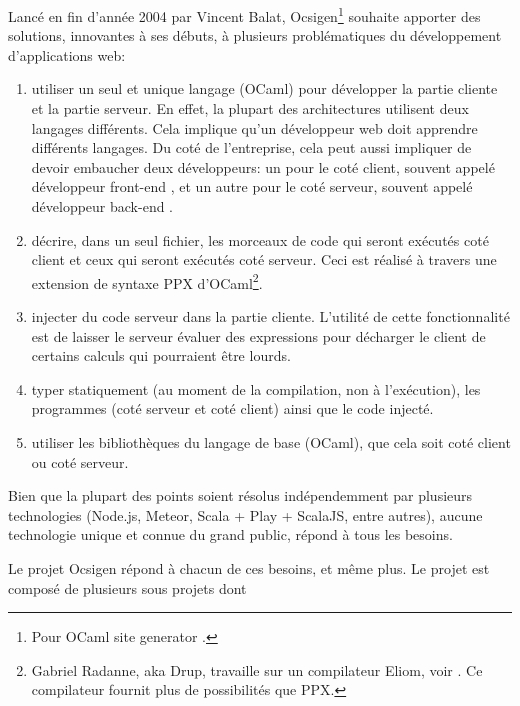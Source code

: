 Lancé en fin d'année 2004 par Vincent Balat, Ocsigen\footnote{Pour \og OCaml site
  generator \fg.} souhaite apporter des solutions, innovantes à ses débuts, à
plusieurs problématiques du développement d'applications web:

\begin{enumerate}
  \item utiliser un seul et unique langage (OCaml) pour développer la partie cliente et
    la partie serveur. En effet, la plupart des architectures utilisent deux
    langages différents. Cela implique qu'un développeur web doit apprendre différents
    langages. Du coté de l'entreprise, cela peut aussi impliquer de devoir
    embaucher deux développeurs: un pour le coté client, souvent appelé
    \og développeur front-end \fg, et un autre pour le coté serveur, souvent appelé
    \og développeur back-end \fg.
  \item décrire, dans un seul fichier, les morceaux de code qui seront
exécutés coté client et ceux qui seront exécutés coté serveur. Ceci est réalisé
à travers une extension de syntaxe PPX d'OCaml\footnote{Gabriel Radanne, aka
  Drup, travaille sur un compilateur Eliom, voir
  \cite{ocsigen-eliomlang-github}. Ce compilateur fournit plus de possibilités
  que PPX.}.
  \item injecter du code serveur dans la partie cliente.
    L'utilité de cette fonctionnalité est de laisser le serveur évaluer
des expressions pour décharger le client de certains calculs qui pourraient être
lourds.
  \item typer statiquement (au moment de la compilation, non à l'exécution), les
    programmes (coté serveur et coté client) ainsi que le code injecté.
  \item utiliser les bibliothèques du langage de base (OCaml), que cela
    soit coté client ou coté serveur.
\end{enumerate}

Bien que la plupart des points soient résolus indépendemment par plusieurs
technologies (Node.js\cite{nodejs-website}, Meteor\cite{meteor-website},
Scala\cite{scala-website} + Play\cite{play-website} +
ScalaJS\cite{scalajs-website}, entre autres), aucune technologie unique et
connue du grand public, répond à tous les besoins.

Le projet Ocsigen répond à chacun de ces besoins, et même plus. Le projet est
composé de plusieurs sous projets dont

